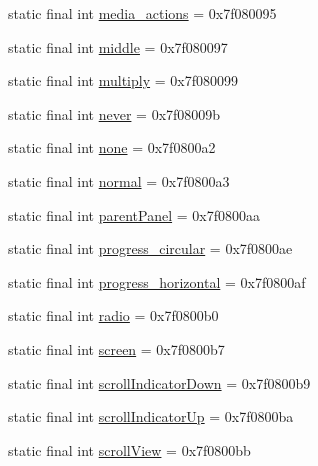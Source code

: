 \begin{DoxyCompactItemize}
\item 
static final int \mbox{\hyperlink{classcom_1_1google_1_1android_1_1gms_1_1R_1_1id_a1cad01031a198673d05b190fa940a926}{media\+\_\+actions}} = 0x7f080095
\item 
static final int \mbox{\hyperlink{classcom_1_1google_1_1android_1_1gms_1_1R_1_1id_af209a73d6c3e33ea6cfec00f80e3121b}{middle}} = 0x7f080097
\item 
static final int \mbox{\hyperlink{classcom_1_1google_1_1android_1_1gms_1_1R_1_1id_a89739903dbd89266890788487f47b853}{multiply}} = 0x7f080099
\item 
static final int \mbox{\hyperlink{classcom_1_1google_1_1android_1_1gms_1_1R_1_1id_a61d3e6b52d424c9a77b513a684d3c8d0}{never}} = 0x7f08009b
\item 
static final int \mbox{\hyperlink{classcom_1_1google_1_1android_1_1gms_1_1R_1_1id_a26c121b826f9e2d5890575d86879e40f}{none}} = 0x7f0800a2
\item 
static final int \mbox{\hyperlink{classcom_1_1google_1_1android_1_1gms_1_1R_1_1id_a3abcaa62eb315c1cf0ad1f3524fe9a82}{normal}} = 0x7f0800a3
\item 
static final int \mbox{\hyperlink{classcom_1_1google_1_1android_1_1gms_1_1R_1_1id_a02d1d525ee9df31c91d78537aa9f6a94}{parent\+Panel}} = 0x7f0800aa
\item 
static final int \mbox{\hyperlink{classcom_1_1google_1_1android_1_1gms_1_1R_1_1id_a1be97f1c52d722b6f034f40ec10795fd}{progress\+\_\+circular}} = 0x7f0800ae
\item 
static final int \mbox{\hyperlink{classcom_1_1google_1_1android_1_1gms_1_1R_1_1id_aabd26db7695fad7009bd8847c28a82d0}{progress\+\_\+horizontal}} = 0x7f0800af
\item 
static final int \mbox{\hyperlink{classcom_1_1google_1_1android_1_1gms_1_1R_1_1id_a58978d6030b52a9d7e090b36bbb120d9}{radio}} = 0x7f0800b0
\item 
static final int \mbox{\hyperlink{classcom_1_1google_1_1android_1_1gms_1_1R_1_1id_a4a3ac0a9403a3c8c56e0c0ff4a829477}{screen}} = 0x7f0800b7
\item 
static final int \mbox{\hyperlink{classcom_1_1google_1_1android_1_1gms_1_1R_1_1id_afdc7fd7d80d65834c028ac391aa57909}{scroll\+Indicator\+Down}} = 0x7f0800b9
\item 
static final int \mbox{\hyperlink{classcom_1_1google_1_1android_1_1gms_1_1R_1_1id_ae65bf8a2b6d97f04cdd67c31cf4b21e8}{scroll\+Indicator\+Up}} = 0x7f0800ba
\item 
static final int \mbox{\hyperlink{classcom_1_1google_1_1android_1_1gms_1_1R_1_1id_a109d443dc98ab9c78807eec0c2f97057}{scroll\+View}} = 0x7f0800bb

\end{DoxyCompactItemize}
